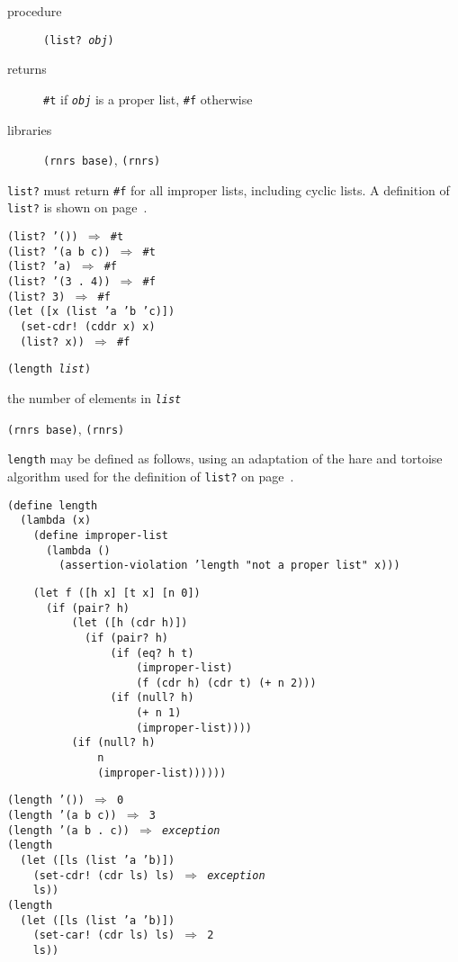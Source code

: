 \begin{description}

\label{objects_s45}\item[procedure] \texttt{(list? \textit{obj})}



\item[returns] \texttt{\#{}t} if \texttt{\textit{obj}} is a proper list, \texttt{\#{}f} otherwise


\item[libraries] \texttt{(rnrs base)}, \texttt{(rnrs)}
\end{description}

\texttt{list?} must return \texttt{\#{}f} for all improper lists, including cyclic
lists.
A definition of \texttt{list?} is shown on page \pageref{further_defn_list_}.

\begin{alltt}
(list? '()) \(\Rightarrow\) \#{}t
(list? '(a b c)) \(\Rightarrow\) \#{}t
(list? 'a) \(\Rightarrow\) \#{}f
(list? '(3 . 4)) \(\Rightarrow\) \#{}f
(list? 3) \(\Rightarrow\) \#{}f
(let ([x (list 'a 'b 'c)])
  (set-cdr! (cddr x) x)
  (list? x)) \(\Rightarrow\) \#{}f
\end{alltt}

\begin{description}

\label{objects_s46}\item[procedure] \texttt{(length \textit{list})}



\item[returns] the number of elements in \texttt{\textit{list}}


\item[libraries] \texttt{(rnrs base)}, \texttt{(rnrs)}
\end{description}

\texttt{length} may be defined as follows, using an adaptation of the
hare and tortoise algorithm used for the definition of \texttt{list?}
on page \pageref{further_defn_list_}.

\begin{alltt}
(define length
  (lambda (x)
    (define improper-list
      (lambda ()
        (assertion-violation 'length "not a proper list" x)))

    (let f ([h x] [t x] [n 0])
      (if (pair? h)
          (let ([h (cdr h)])
            (if (pair? h)
                (if (eq? h t)
                    (improper-list)
                    (f (cdr h) (cdr t) (+ n 2)))
                (if (null? h)
                    (+ n 1)
                    (improper-list))))
          (if (null? h)
              n
              (improper-list))))))

(length '()) \(\Rightarrow\) 0
(length '(a b c)) \(\Rightarrow\) 3
(length '(a b . c)) \(\Rightarrow\) \textit{exception}
(length
  (let ([ls (list 'a 'b)])
    (set-cdr! (cdr ls) ls) \(\Rightarrow\) \textit{exception}
    ls))
(length
  (let ([ls (list 'a 'b)])
    (set-car! (cdr ls) ls) \(\Rightarrow\) 2
    ls))
\end{alltt}

